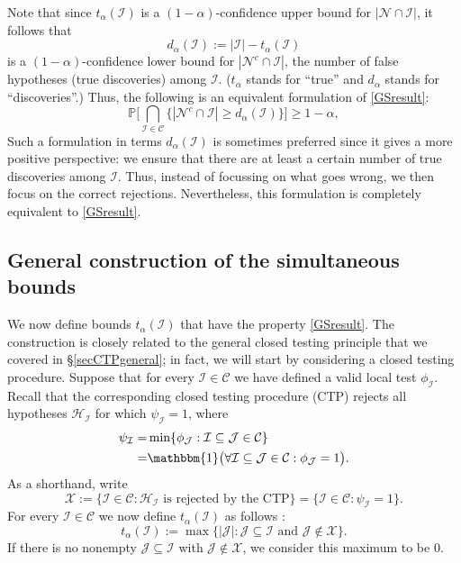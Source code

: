 \documentclass[11pt]{article}
\theoremstyle{plain}
\theoremstyle{definition}
\newcommand{\N}{\mathcal{N}}
\newcommand{\I}{\mathcal{I}}
\newcommand{\J}{\mathcal{J}}
\newcommand{\X}{\mathcal{X}}
\newcommand{\C}{\mathcal{C}}
\newcommand{\Hy}{\mathcal{H}}
\newcommand{\subs}{\mathcal{C}}
\newcommand{\citp}{\citep}
\begin{document}
   Note that since $t_{\alpha}(\I)$ is a $(1-\alpha)$-confidence upper bound for $|\N\cap\I|$, it follows that 
   \begin{equation} \label{eq:dalpha}
   d_{\alpha}(\I):=|\I|- t_{\alpha}(\I)
   \end{equation}   
    is a $(1-\alpha)$-confidence lower bound for $|\N^c\cap \I|$, the number of false hypotheses (true discoveries) among $\I$. ($t_{\alpha}$ stands for ``true'' and $d_{\alpha}$ stands for ``discoveries''.) Thus, the following is an equivalent formulation of \eqref{GSresult}:
   \begin{equation} \label{GSresultTDP}
   \mathbb{P} \Bigg[\bigcap_{\I\in\subs}\Big\{     |\N^c\cap \I| \geq  d_{\alpha}(\I)   \Big\} \Bigg]\geq 1-\alpha,
   \end{equation}
Such a formulation in terms $d_{\alpha}(\I)$ is sometimes preferred since it gives a more positive perspective: we ensure that there are at least a certain number of true discoveries among $\I$. Thus, instead of focussing on what goes wrong, we then focus on the correct rejections. Nevertheless, this formulation is completely equivalent to \eqref{GSresult}.


\subsection{General construction of the simultaneous bounds}
We now define bounds $t_{\alpha}(\I)$ that have the property \eqref{GSresult}. The construction is closely related to the general closed testing principle that we covered in  \S\ref{secCTPgeneral}; in fact, we will start by considering a closed testing procedure. Suppose that for every $\I\in\C$ we have defined a valid local test $\phi_{\I}$. Recall that the corresponding closed testing procedure (CTP) rejects all hypotheses $\Hy_{\I}$ for which $\psi_{\I}=1$, where  
\begin{align*}
\psi_{\I} = &  \min\{\phi_{\J}: \I\subseteq \J\in \subs\}\\
= & \mathbbm{1}\big(\forall  \I\subseteq \J\in \subs:  \phi_{\J}=1 \big).
\end{align*}
 As a shorthand, write
$$\X := \{\I\in \C: \Hy_{\I}   \text{ is rejected by the CTP}\} =  \{\I\in \C:  \psi_{\I}=1\}.$$
For every $\I\in \C$  we now define $t_{\alpha}(\I)$ as follows \citp{goeman2011multiple}:
\begin{equation} \label{eq:talpha}
t_{\alpha}(\I):=\max\{|\J|: \J \subseteq \I \text{ and }  \J\not \in \X\}.
\end{equation}
If there is no nonempty $\J \subseteq \I$ with  $\J\not \in \X$, we consider this maximum to be 0. 
\end{document}
